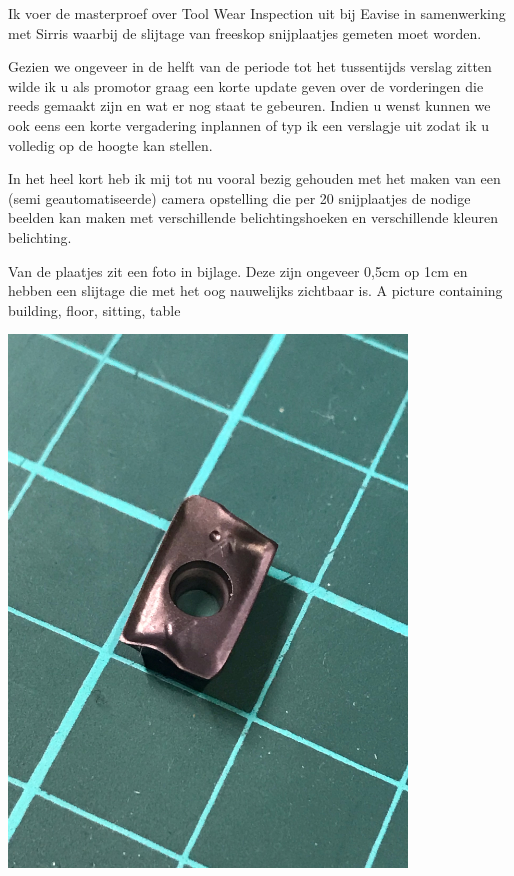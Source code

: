 \documentclass{article}
\begin{document}
 

Ik voer de masterproef over Tool Wear Inspection uit bij Eavise in samenwerking met Sirris waarbij de slijtage van freeskop snijplaatjes gemeten moet worden.

Gezien we ongeveer in de helft van de periode tot het tussentijds verslag zitten wilde ik u als promotor graag een korte update geven over de vorderingen die reeds gemaakt zijn en wat er nog staat te gebeuren. Indien u wenst kunnen we ook eens een korte vergadering inplannen of typ ik een verslagje uit zodat ik u volledig op de hoogte kan stellen.

 

In het heel kort heb ik mij tot nu vooral bezig gehouden met het maken van een (semi geautomatiseerde) camera opstelling die per 20 snijplaatjes de nodige beelden kan maken met verschillende belichtingshoeken en verschillende kleuren belichting.

Van de plaatjes zit een foto in bijlage. Deze zijn ongeveer 0,5cm op 1cm en hebben een slijtage die met het oog nauwelijks zichtbaar is. A picture containing building, floor, sitting, table



\includegraphics[width=4.166667in, keepaspectratio=true]{./ZimFiles_files/Verslagen/Activiteiten_rapport/Activities/Masterproef_Tool_Wear_Inspection_-_Update_4_TG/plaatje_1cm.jpeg}
\end{document}

